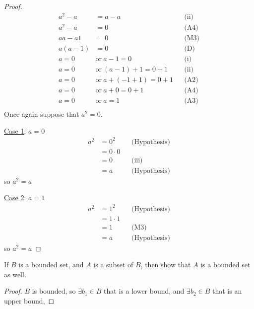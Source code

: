 \documentclass[12pt]{article}
\begin{document}
\begin{enumerate}
\begin{proof}
		      \begin{align*}
			      a^2-a    & = a-a                      &  & \text{(ii)} \\
			      a^2-a    & = 0                        &  & \text{(A4)} \\
			      aa - a1  & = 0                        &  & \text{(M3)} \\
			      a(a-1)   & = 0                        &  & \text{(D)}  \\
			      a = 0 \  & \text{or} \ a-1 = 0        &  & \text{(i)}  \\
			      a = 0 \  & \text{or} \ (a-1)+1 = 0+1  &  & \text{(ii)} \\
			      a = 0 \  & \text{or} \ a+(-1+1) = 0+1 &  & \text{(A2)} \\
			      a = 0 \  & \text{or} \ a+0 = 0+1      &  & \text{(A4)} \\
			      a = 0 \  & \text{or} \ a = 1          &  & \text{(A3)} \\
		      \end{align*}
		      Once again suppose that $a^2 = 0$.
		      \item[\underline{Case 1}: $a = 0$]
		      \begin{align*}
			      a^2 & = 0^2       &  & \text{(Hypothesis)} \\
			          & = 0 \cdot 0                          \\
			          & = 0         &  & \text{(iii)}        \\
			          & = a         &  & \text{(Hypothesis)}
		      \end{align*}
		      so $a^2 = a$
		      \item[\underline{Case 2}: $a = 1$]
		      \begin{align*}
			      a^2 & = 1^2       &  & \text{(Hypothesis)} \\
			          & = 1 \cdot 1                          \\
			          & = 1         &  & \text{(M3)}         \\
			          & = a         &  & \text{(Hypothesis)}
		      \end{align*}
		      so $a^2 = a$
	      \end{proof}
	\item If $B$ is a bounded set, and $A$ is a subset of $B$, then show that $A$ is a bounded set as well.
	      \begin{proof} $B$ is bounded, so $\exists b_1 \in B$ that is a lower bound, and $\exists b_2 \in B$ that is an upper bound,

\end{proof}
\end{enumerate}
\end{document}
